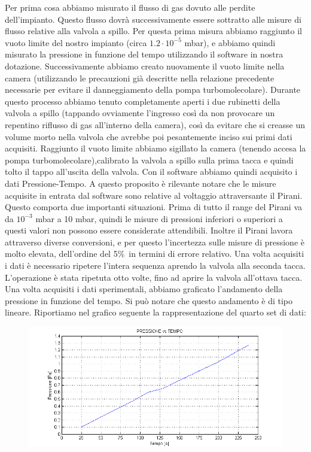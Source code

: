 \documentclass[a4paper,11pt]{article}
\begin{document}
Per prima cosa abbiamo misurato il flusso di gas dovuto alle perdite dell'impianto. Questo flusso dovrà successivamente essere sottratto alle misure di flusso relative alla valvola a spillo. Per questa prima misura abbiamo raggiunto il vuoto limite del nostro impianto (circa $1.2\cdot10^{-5}$ mbar), e abbiamo quindi misurato la pressione in funzione del tempo utilizzando il software in nostra dotazione.
Successivamente abbiamo creato nuovamente il vuoto limite nella camera (utilizzando le precauzioni già descritte nella relazione precedente necessarie per evitare il danneggiamento della pompa turbomolecolare). Durante questo processo abbiamo tenuto completamente aperti i due rubinetti della valvola a spillo (tappando ovviamente l'ingresso così da non provocare un repentino riflusso di gas all'interno della camera), così da evitare che si creasse un volume morto nella valvola che avrebbe poi pesantemente inciso sui primi dati acquisiti. Raggiunto il vuoto limite abbiamo sigillato la camera (tenendo accesa la pompa turbomolecolare),calibrato la valvola a spillo sulla prima tacca e quindi tolto il tappo all'uscita della valvola. Con il software abbiamo quindi acquisito i dati Pressione-Tempo. 
A questo proposito è rilevante notare che le misure acquisite in entrata dal software sono relative al voltaggio attraversante il Pirani. Questo comporta due importanti situazioni. Prima di tutto il range del Pirani va da $10^{-3}$ mbar a 10 mbar, quindi le misure di pressioni inferiori o superiori a questi valori non possono essere considerate attendibili. Inoltre il Pirani lavora attraverso diverse conversioni, e per questo l'incertezza sulle misure di pressione è molto elevata, dell'ordine del 5\%\ in termini di errore relativo. 
Una volta acquisiti i dati è necessario ripetere l'intera sequenza aprendo  la valvola alla seconda tacca. L'operazione è stata ripetuta otto volte, fino ad aprire la valvola all'ottava tacca.  
Una volta acquisiti i dati sperimentali, abbiamo graficato l'andamento della pressione in funzione del tempo. Si può notare che questo andamento è di tipo lineare. Riportiamo nel grafico seguente la rappresentazione del quarto set di dati:
 \begin{center} 
\begin{figure}[htpd]
\hspace{-50 pt}
\includegraphics{graficoP4.png}


\end{figure}
\end{center}
\end{document}
